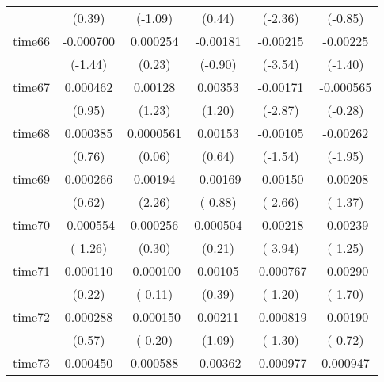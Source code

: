 \begin{table}[htbp]
\begin{tabular}{l*{5}{c}}
            &      (0.39)         &     (-1.09)         &      (0.44)         &     (-2.36)         &     (-0.85)         \\
time66      &   -0.000700         &    0.000254         &    -0.00181         &    -0.00215\sym{***}&    -0.00225         \\
            &     (-1.44)         &      (0.23)         &     (-0.90)         &     (-3.54)         &     (-1.40)         \\
time67      &    0.000462         &     0.00128         &     0.00353         &    -0.00171\sym{**} &   -0.000565         \\
            &      (0.95)         &      (1.23)         &      (1.20)         &     (-2.87)         &     (-0.28)         \\
time68      &    0.000385         &   0.0000561         &     0.00153         &    -0.00105         &    -0.00262         \\
            &      (0.76)         &      (0.06)         &      (0.64)         &     (-1.54)         &     (-1.95)         \\
time69      &    0.000266         &     0.00194\sym{*}  &    -0.00169         &    -0.00150\sym{**} &    -0.00208         \\
            &      (0.62)         &      (2.26)         &     (-0.88)         &     (-2.66)         &     (-1.37)         \\
time70      &   -0.000554         &    0.000256         &    0.000504         &    -0.00218\sym{***}&    -0.00239         \\
            &     (-1.26)         &      (0.30)         &      (0.21)         &     (-3.94)         &     (-1.25)         \\
time71      &    0.000110         &   -0.000100         &     0.00105         &   -0.000767         &    -0.00290         \\
            &      (0.22)         &     (-0.11)         &      (0.39)         &     (-1.20)         &     (-1.70)         \\
time72      &    0.000288         &   -0.000150         &     0.00211         &   -0.000819         &    -0.00190         \\
            &      (0.57)         &     (-0.20)         &      (1.09)         &     (-1.30)         &     (-0.72)         \\
time73      &    0.000450         &    0.000588         &    -0.00362         &   -0.000977         &    0.000947         \\

\end{tabular}
\end{table}
